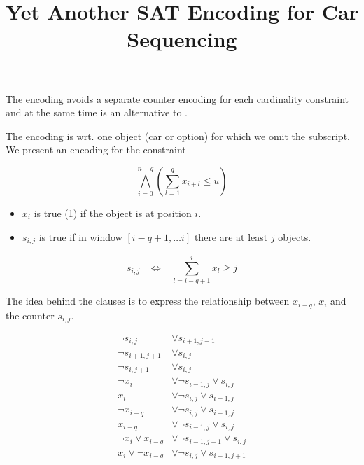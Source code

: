 \documentclass{article}
\title{Yet Another SAT Encoding for Car Sequencing}
\begin{document}
\maketitle

The encoding avoids a separate counter encoding for each cardinality
constraint and  at the same time is an alternative to \cite{Mayer13}. 

The encoding is wrt. one object (car or option) for which we omit the
subscript. We present an encoding for the constraint

$$\bigwedge_{i=0}^{n-q}(\sum_{l=1}^q x_{i+l} \leq u )$$

\begin{itemize}
    \item $x_i$ is true (1) if the object is at position $i$. 
    \item $s_{i,j}$ is true if in window $[i-q+1, \ldots i]$ there are at least $j$ objects. 
\end{itemize}

$$s_{i,j} \;\;\; \Leftrightarrow \;\;\; \sum_{l=i-q+1}^i x_l \geq j $$

The idea behind the clauses is to express the relationship between $x_{i-q}$,
$x_i$ and the counter $s_{i,j}$. 

\begin{align}
    \neg s_{i,j} & \vee s_{i+1,j-1} \\
    \neg s_{i+1,j+1} & \vee s_{i,j} \\
    \neg s_{i,j+1} & \vee s_{i,j} \\
    \neg x_i & \vee \neg s_{i-1,j} \vee s_{i,j} \\
         x_i & \vee \neg s_{i,j} \vee s_{i-1,j} \\
    \neg x_{i-q} & \vee \neg s_{i,j} \vee s_{i-1,j} \\
         x_{i-q} & \vee \neg s_{i-1,j} \vee s_{i,j} \\
    \neg x_i \vee x_{i-q} & \vee \neg s_{i-1,j-1} \vee s_{i,j} \\
         x_i \vee \neg x_{i-q} & \vee \neg s_{i,j} \vee s_{i-1,j+1}
\end{align}




\end{document}
